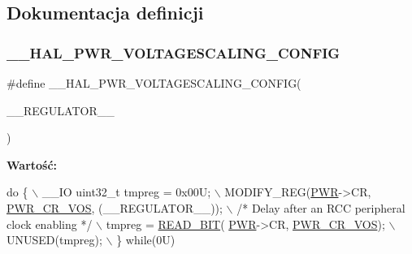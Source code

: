 \subsection{Dokumentacja definicji}
\mbox{\label{group___p_w_r_ex___exported___constants_ga1ee778f7ff494723bd0ef04ec44b0f77}} 
\subsubsection{\texorpdfstring{\+\_\+\+\_\+\+H\+A\+L\+\_\+\+P\+W\+R\+\_\+\+V\+O\+L\+T\+A\+G\+E\+S\+C\+A\+L\+I\+N\+G\+\_\+\+C\+O\+N\+F\+IG}{\_\_HAL\_PWR\_VOLTAGESCALING\_CONFIG}}
{\footnotesize\ttfamily \#define \+\_\+\+\_\+\+H\+A\+L\+\_\+\+P\+W\+R\+\_\+\+V\+O\+L\+T\+A\+G\+E\+S\+C\+A\+L\+I\+N\+G\+\_\+\+C\+O\+N\+F\+IG(\begin{DoxyParamCaption}\item[{}]{\+\_\+\+\_\+\+R\+E\+G\+U\+L\+A\+T\+O\+R\+\_\+\+\_\+ }\end{DoxyParamCaption})}

{\bfseries Wartość\+:}
\begin{DoxyCode}
\textcolor{keywordflow}{do} \{                                                     \(\backslash\)
                                                            \_\_IO uint32\_t tmpreg = 0x00U;                  
            \(\backslash\)
                                                            MODIFY\_REG(\hyperlink{group___peripheral__declaration_ga04651c526497822a859942b928e57f8e}{PWR}->CR, 
      \hyperlink{group___peripheral___registers___bits___definition_gaccc33f1ba4e374e116ffa50f3a503030}{PWR\_CR\_VOS}, (\_\_REGULATOR\_\_));   \(\backslash\)
                                                            \textcolor{comment}{/* Delay after an RCC peripheral clock enabling
       */}  \(\backslash\)
                                                            tmpreg = \hyperlink{group___exported__macro_ga822bb1bb9710d5f2fa6396b84e583c33}{READ\_BIT}(
      \hyperlink{group___peripheral__declaration_ga04651c526497822a859942b928e57f8e}{PWR}->CR, \hyperlink{group___peripheral___registers___bits___definition_gaccc33f1ba4e374e116ffa50f3a503030}{PWR\_CR\_VOS});             \(\backslash\)
                                                            UNUSED(tmpreg);                                
           \(\backslash\)
                                                          \} \textcolor{keywordflow}{while}(0U)
\end{DoxyCode}


